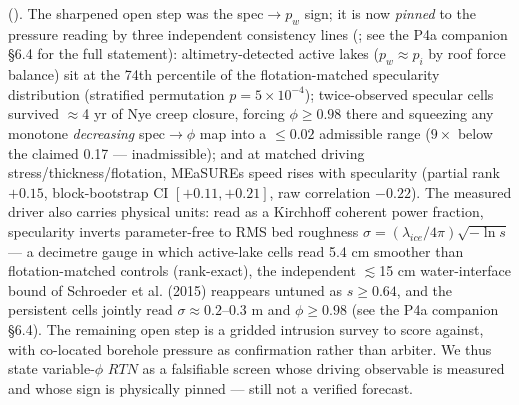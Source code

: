 \documentclass[11pt]{article}
\begin{document}
(). The sharpened open step was the spec\ensuremath{\to}$p_{w}$ sign; it is now \emph{pinned} to the pressure reading by three independent consistency lines (; see the P4a companion §6.4 for the full statement): altimetry-detected active lakes ($p_{w}\approx p_{i}$ by roof force balance) sit at the 74th percentile of the flotation-matched specularity distribution (stratified permutation $p=5\times 10^{-4}$); twice-observed specular cells survived $\approx $4 yr of Nye creep closure, forcing $\phi \ge 0.98$ there and squeezing any monotone \emph{decreasing} spec$\to \phi $ map into a $\le 0.02$ admissible range ($9\times $ below the claimed 0.17 — inadmissible); and at matched driving stress/thickness/flotation, MEaSUREs speed rises with specularity (partial rank $+0.15$, block-bootstrap CI $[+0.11,+0.21]$, raw correlation $-0.22$). The measured driver also carries physical units: read as a Kirchhoff coherent power fraction, specularity inverts parameter-free to RMS bed roughness $\sigma =(\lambda _{ice}/4\pi )\sqrt{-\ln s}$ — a decimetre gauge in which active-lake cells read 5.4 cm smoother than flotation-matched controls (rank-exact), the independent $\lesssim $15 cm water-interface bound of Schroeder et al. (2015) reappears untuned as $s\ge 0.64$, and the persistent cells jointly read $\sigma \approx 0.2$--$0.3$ m and $\phi \ge 0.98$ (see the P4a companion §6.4). The remaining open step is a gridded intrusion survey to score against, with co-located borehole pressure as confirmation rather than arbiter. We thus state variable-$\phi $ $RTN$ as a falsifiable screen whose driving observable is measured and whose sign is physically pinned — still not a verified forecast.
\end{document}
